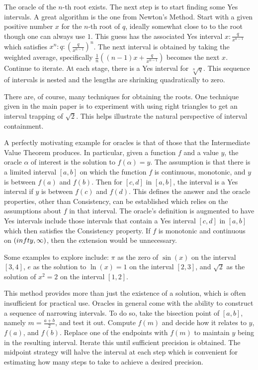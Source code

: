 \documentclass[12pt]{article}
\theoremstyle{remark}
\begin{document}
The oracle of the $n$-th root exists. The next step is to start finding some Yes intervals. A great algorithm is the one from Newton's Method. Start with a given positive number $x$ for the $n$-th root of $q$, ideally somewhat close to to the root though one can always use $1$. This guess has the associated Yes interval $x:\frac{q}{x^{n-1}}$ which satisfies $x^n : q : (\frac{q}{x^{n-1}})^n$. The next interval is obtained by taking the weighted average, specifically $\frac{1}{n}( (n-1) x + \frac{q}{x^{n-1}} )$ becomes the next $x$. Continue to iterate. At each stage, there is a Yes interval for $\sqrt[n]{q}$. This sequence of intervals is nested and the lengths are shrinking quadratically to zero.  

There are, of course, many techniques for obtaining the roots. One technique given in the main paper is to experiment with using right triangles to get an interval trapping of $\sqrt{2}$. This helps illustrate the natural perspective of interval containment.  

A perfectly motivating example for oracles is that of those that the Intermediate Value Theorem produces. In particular, given a function $f$ and a value $y$, the oracle $\alpha$ of interest is the solution to $f(\alpha) = y$. The assumption is that there is a limited interval $[a,b]$ on which the function $f$ is continuous, monotonic, and $y$ is between $f(a)$ and $f(b)$. Then for $[c,d]$ in $[a,b]$, the interval is a Yes interval if $y$ is between $f(c)$ and $f(d)$. This defines the answer and the oracle properties, other than Consistency, can be established which relies on the assumptions about $f$ in that interval. The oracle's definition is augmented to have Yes intervals include those intervals that contain a Yes interval $[c,d]$ in $[a,b]$ which then satisfies the Consistency property. If $f$ is monotonic and continuous on $(\-infty, \infty)$, then the extension would be unnecessary.  

Some examples to explore include: $\pi$ as the zero of $\sin(x)$ on the interval $[3,4]$, $e$ as the solution to  $\ln(x)=1$ on the interval $[2,3]$, and $\sqrt{2}$ as the solution of $x^2 = 2$ on the interval $[1,2]$. 

This method provides more than just the existence of a solution, which is often insufficient for practical use. Oracles in general come with the ability to construct a sequence of narrowing intervals. To do so, take the bisection point of $[a,b]$, namely $m =\frac{a+b}{2}$, and test it out. Compute $f(m)$ and decide how it relates to $y$, $f(a)$, and $f(b)$. Replace one of the endpoints with $f(m)$ to maintain $y$ being in the resulting interval. Iterate this until sufficient precision is obtained.  The midpoint strategy will halve the interval at each step which is convenient for estimating how many steps to take to achieve a desired precision. 
\end{document}
